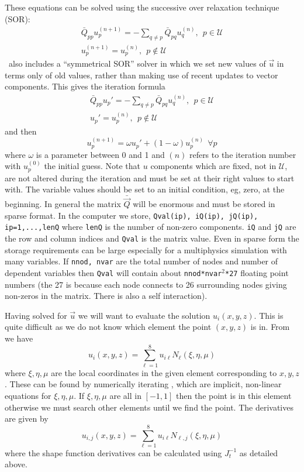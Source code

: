 \documentclass[a4paper]{article}
\begin{document}
These equations can be solved using the successive over relaxation
technique (SOR):
\begin{eqnarray}
  \bar Q_{pp} u_p^{(n+1)}=-\sum_{q\ne p} \bar Q_{pq} u_q^{(n)},~~p\in\mathcal U
  \label{iter1}\\
  u_p^{(n+1)}=u_p^{(n)},~~p\notin\mathcal U
\end{eqnarray}
 \zinc\ also includes a ``symmetrical SOR'' solver in which we set new
 values of $\vec u$ in terms only of old values, rather than making
 use of recent updates to vector components. This gives the iteration formula
\begin{eqnarray}
  \bar Q_{pp} u_p'=-\sum_{q\ne p} \bar Q_{pq} u_q^{(n)},~~p\in\mathcal U
  \label{iter}\\
  u_p'=u_p^{(n)},~~p\notin\mathcal U
\end{eqnarray}
and then
\begin{equation}
  u_p^{(n+1)}=\omega u_p'+(1-\omega) u_p^{(n)}~~\forall p
\end{equation}
where $\omega$ is a parameter between 0 and 1 and $(n)$ refers to the
iteration number with $u_p^{(0)}$ the initial guess. Note that $u$
components which are fixed, not in $\mathcal U$, are not altered
during the iteration and must be set at their right values to start
with. The variable values should be set to an initial condition, eg,
zero, at the beginning. In general the matrix $\bar \vec Q$ will be
enormous and must be stored in sparse format. In the computer we
store, \texttt{Qval(ip), iQ(ip), jQ(ip), ip=1,...,lenQ} where
\texttt{lenQ} is the number of non-zero components. \texttt{iQ} and
\texttt{jQ} are the row and column indices and \texttt{Qval} is the
matrix value. Even in sparse form the storage requirements can be
large especially for a multiphysics simulation with many variables. If
\texttt{nnod, nvar} are the total number of nodes and number of
dependent variables then \texttt{Qval} will contain about
\texttt{nnod*nvar$^2$*27} floating point numbers (the 27 is because
each node connects to 26 surrounding nodes giving non-zeros in the
matrix. There is also a self interaction).

Having solved for $\vec u$ we will want to evaluate the solution
$u_i(x,y,z)$. This is quite difficult as we do not know which element
the point $(x,y,z)$ is in. From  we have
\begin{equation}
  u_i(x,y,z)=\sum_{\ell=1}^8 u_{i\ell} N_\ell(\xi,\eta,\mu)
\end{equation}
where $\xi,\eta,\mu$ are the local coordinates in the given element
corresponding to $x,y,z$. These can be found by
numerically iterating , which are implicit, non-linear
equations for $\xi,\eta,\mu$. If $\xi,\eta,\mu$ are all in $[-1,1]$
then the point is in this element otherwise we must search other
elements until we find the point. The derivatives are given by
\begin{equation}
  u_{i,j}(x,y,z)=\sum_{\ell=1}^8 u_{i\ell} N_{\ell,j}(\xi,\eta,\mu)
\end{equation}
where the shape function derivatives can be calculated using
$J_t^{-1}$ as detailed above.
\end{document}
